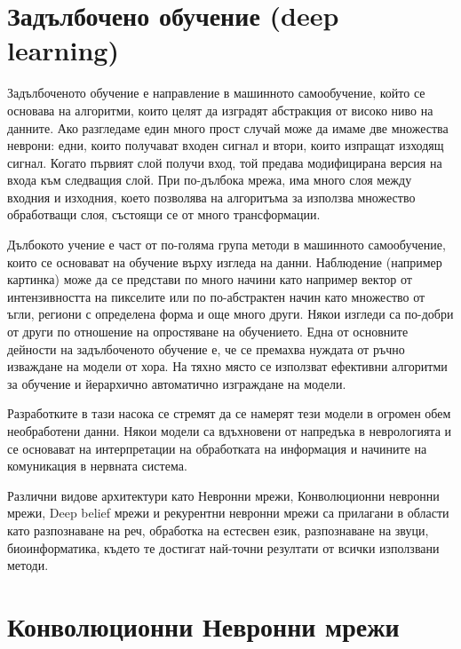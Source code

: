 
\section{Задълбочено обучение (deep learning)}

Задълбоченото обучение е направление в машинното самообучение, който се основава на алгоритми, които целят да изградят абстракция от високо ниво на данните. Ако разгледаме един много прост случай може да имаме две множества неврони: едни, които получават входен сигнал и втори, които изпращат изходящ сигнал. Когато първият слой получи вход, той предава модифицирана версия на входа към следващия слой. При по-дълбока мрежа, има много слоя между входния и изходния, което позволява на алгоритъма за използва множество обработващи слоя, състоящи се от много трансформации. \cite{DeepLearningMethods} \cite{DeepArchitectures}

Дълбокото учение е част от по-голяма група методи в машинното самообучение, които се основават на обучение върху изгледа на данни. Наблюдение (например картинка) може да се представи по много начини като например вектор от интензивността на пикселите или по по-абстрактен начин като множество от ъгли, региони с определена форма и още много други. Някои изгледи са по-добри от други по отношение на опростяване на обучението. Една от основните дейности на задълбоченото обучение е, че се премахва нуждата от ръчно изваждане на модели от хора. На тяхно място се използват ефективни алгоритми за обучение и йерархично автоматично изграждане на модели.

Разработките в тази насока се стремят да се намерят тези модели в огромен обем необработени данни. Някои модели са вдъхновени от напредъка в неврологията и се основават на интерпретации на обработката на информация и начините на комуникация в нервната система.

Различни видове архитектури като Невронни мрежи, Конволюционни невронни мрежи, Deep belief мрежи и рекурентни невронни мрежи са прилагани в области като разпознаване на реч, обработка на естесвен език, разпознаване на звуци, биоинформатика, където те достигат най-точни резултати от всички използвани методи.


\section{Конволюционни Невронни мрежи}

